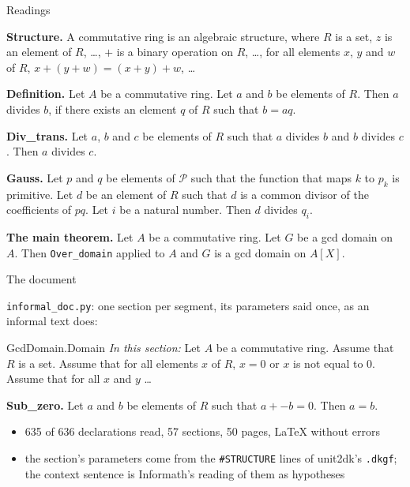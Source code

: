 \documentclass[10pt,aspectratio=169]{beamer}
\newcommand{\file}[1]{\texttt{#1}}
\begin{document}
\begin{frame}{Readings}

\small
\textbf{Structure.} A commutative ring is an algebraic structure, where
$R$ is a set, $z$ is an element of $R$, \ldots, $+$ is a binary operation
on $R$, \ldots, for all elements $x$, $y$ and $w$ of $R$,
$x + (y + w) = (x + y) + w$, \ldots

\medskip
\textbf{Definition.} Let $A$ be a commutative ring. Let $a$ and $b$ be
elements of $R$. Then $a$ divides $b$, if there exists an element $q$ of
$R$ such that $b = aq$.

\medskip
\textbf{Div\_trans.} Let $a$, $b$ and $c$ be elements of $R$ such that $a$
divides $b$ and $b$ divides $c$. Then $a$ divides $c$.

\medskip
\textbf{Gauss.} Let $p$ and $q$ be elements of $\mathcal{P}$ such that the
function that maps $k$ to $p_k$ is primitive. Let $d$ be an element of $R$
such that $d$ is a common divisor of the coefficients of $pq$. Let $i$ be
a natural number. Then $d$ divides $q_i$.

\medskip
\textbf{The main theorem.} Let $A$ be a commutative ring. Let $G$ be a gcd
domain on $A$. Then \texttt{Over\_domain} applied to $A$ and $G$ is a gcd
domain on $A[X]$.

\end{frame}

\begin{frame}{The document}

\small
\file{informal\_doc.py}: one section per segment, its parameters said
once, as an informal text does:

\begin{block}{GcdDomain.Domain}
\emph{In this section:} Let $A$ be a commutative ring. Assume that $R$ is
a set. Assume that for all elements $x$ of $R$, $x = 0$ or $x$ is not equal
to $0$. Assume that for all $x$ and $y$ \ldots

\textbf{Sub\_zero.} Let $a$ and $b$ be elements of $R$ such that
$a + -b = 0$. Then $a = b$.
\end{block}

\begin{itemize}
\item 635 of 636 declarations read, 57 sections, 50 pages, LaTeX without
  errors
\item the section's parameters come from the \texttt{\#STRUCTURE} lines
  of unit2dk's \file{.dkgf}; the context sentence is Informath's reading
  of them as hypotheses
\end{itemize}

\end{frame}
\end{document}
